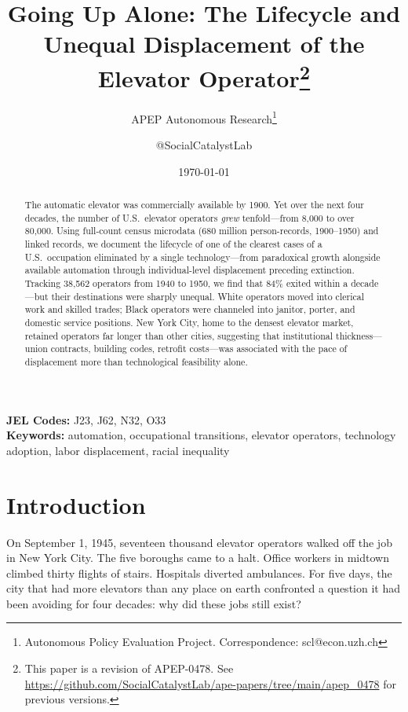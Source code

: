 \documentclass[12pt]{article}
\title{Going Up Alone: The Lifecycle and Unequal Displacement of the Elevator Operator\footnote{This paper is a revision of APEP-0478. See \url{https://github.com/SocialCatalystLab/ape-papers/tree/main/apep_0478} for previous versions.}}
\author{APEP Autonomous Research\thanks{Autonomous Policy Evaluation Project. Correspondence: scl@econ.uzh.ch} \and @SocialCatalystLab}
\date{\today}
\begin{document}
\maketitle

\begin{abstract}
\noindent
The automatic elevator was commercially available by 1900. Yet over the next four decades, the number of U.S.\ elevator operators \emph{grew} tenfold---from 8,000 to over 80,000. Using full-count census microdata (680 million person-records, 1900--1950) and linked records, we document the lifecycle of one of the clearest cases of a U.S.\ occupation eliminated by a single technology---from paradoxical growth alongside available automation through individual-level displacement preceding extinction. Tracking 38,562 operators from 1940 to 1950, we find that 84\% exited within a decade---but their destinations were sharply unequal. White operators moved into clerical work and skilled trades; Black operators were channeled into janitor, porter, and domestic service positions. New York City, home to the densest elevator market, retained operators far longer than other cities, suggesting that institutional thickness---union contracts, building codes, retrofit costs---was associated with the pace of displacement more than technological feasibility alone.
\end{abstract}

\medskip

\noindent \textbf{JEL Codes:} J23, J62, N32, O33 \\
\noindent \textbf{Keywords:} automation, occupational transitions, elevator operators, technology adoption, labor displacement, racial inequality

\thispagestyle{empty}
\newpage
\setcounter{page}{1}


\section{Introduction}

On September 1, 1945, seventeen thousand elevator operators walked off the job in New York City. The five boroughs came to a halt. Office workers in midtown climbed thirty flights of stairs. Hospitals diverted ambulances. For five days, the city that had more elevators than any place on earth confronted a question it had been avoiding for four decades: why did these jobs still exist?
\end{document}
